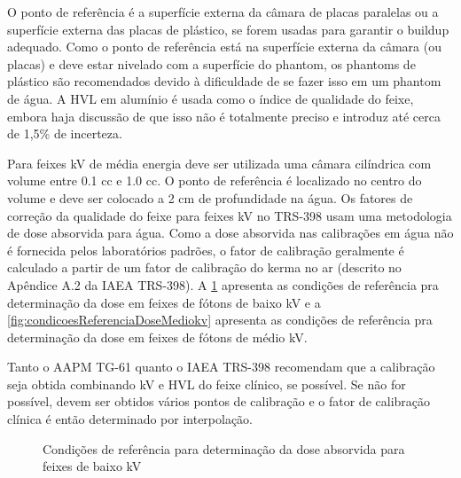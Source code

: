\documentclass[11pt,a4paper]{article}
\begin{document}
	O ponto de referência é a superfície externa da câmara de placas paralelas ou a superfície externa das placas de plástico, se forem usadas para garantir o buildup adequado. Como o ponto de referência está na superfície externa da câmara (ou placas) e deve estar nivelado com a superfície do phantom, os phantoms de plástico são recomendados devido à dificuldade de se fazer isso em um phantom de água. A HVL em alumínio é usada como o índice de qualidade do feixe, embora haja discussão de que isso não é totalmente preciso e introduz até cerca de 1,5\% de incerteza.
	
	Para feixes kV de média energia deve ser utilizada uma câmara cilíndrica com volume entre 0.1 cc e 1.0 cc. O ponto de referência é localizado no centro do volume e deve ser colocado a 2 cm de profundidade na água. Os fatores de correção da qualidade do feixe para feixes kV no TRS-398 usam uma metodologia de dose absorvida para água. Como a dose absorvida nas calibrações em água não é fornecida pelos laboratórios padrões, o fator de calibração geralmente é calculado a partir de um fator de calibração do kerma no ar (descrito no Apêndice A.2 da IAEA TRS-398). A \ref{fig:condicoesReferenciaDosekv} apresenta as condições de referência pra determinação da dose em feixes de fótons de baixo kV e a \ref{fig:condicoesReferenciaDoseMediokv} apresenta as condições de referência pra determinação da dose em feixes de fótons de médio kV.

	Tanto o AAPM TG-61 quanto o IAEA TRS-398 recomendam que a calibração seja obtida combinando kV e HVL do feixe clínico, se possível. Se não for possível, devem ser obtidos vários pontos de calibração e o fator de calibração clínica é então determinado por interpolação.

	

	\begin{figure}[h]
		\centering
		\caption{Condições de referência para determinação da dose absorvida para feixes de baixo kV}
		\label{fig:condicoesReferenciaDosekv}
	\end{figure}
\end{document}
